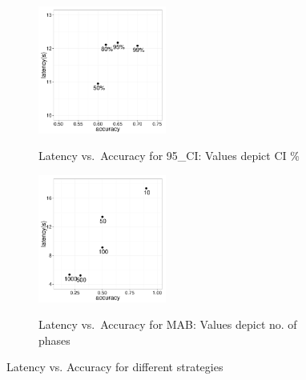 \begin{figure}[h] 
\centering
\begin{subfigure}{0.49\linewidth}
\centering
{\includegraphics[width=4.2cm] {Images/latency_vs_accuracy_ci.pdf}}
\caption{Latency vs.~Accuracy for 95\_CI: Values depict CI \%}
\label{fig:latency_vs_accuracy_ci}
\end{subfigure}
\begin{subfigure}{0.49\linewidth}
\centering
{\includegraphics[width=4.2cm] {Images/latency_vs_accuracy_mab.pdf}}
\caption{Latency vs.~Accuracy for MAB: Values depict no. of phases}
\label{fig:latency_vs_accuracy_mab}
\end{subfigure}
\label{fig:accuracy}
\vspace{-10pt}
\caption{Latency vs. Accuracy for different strategies}
\vspace{-10pt}
\end{figure}








